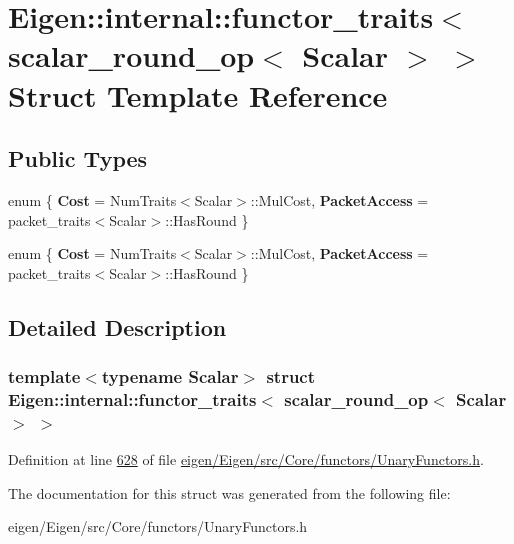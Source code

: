 \hypertarget{struct_eigen_1_1internal_1_1functor__traits_3_01scalar__round__op_3_01_scalar_01_4_01_4}{}\section{Eigen\+:\+:internal\+:\+:functor\+\_\+traits$<$ scalar\+\_\+round\+\_\+op$<$ Scalar $>$ $>$ Struct Template Reference}
\label{struct_eigen_1_1internal_1_1functor__traits_3_01scalar__round__op_3_01_scalar_01_4_01_4}
\subsection*{Public Types}
\begin{DoxyCompactItemize}
\item 
\mbox{\label{struct_eigen_1_1internal_1_1functor__traits_3_01scalar__round__op_3_01_scalar_01_4_01_4_af1565cba823ebf18c1f3a143ba25bf5b}} 
enum \{ {\bfseries Cost} = Num\+Traits$<$Scalar$>$\+:\+:Mul\+Cost, 
{\bfseries Packet\+Access} = packet\+\_\+traits$<$Scalar$>$\+:\+:Has\+Round
 \}
\item 
\mbox{\label{struct_eigen_1_1internal_1_1functor__traits_3_01scalar__round__op_3_01_scalar_01_4_01_4_a13d0d18354014fda4cb21c72f826958c}} 
enum \{ {\bfseries Cost} = Num\+Traits$<$Scalar$>$\+:\+:Mul\+Cost, 
{\bfseries Packet\+Access} = packet\+\_\+traits$<$Scalar$>$\+:\+:Has\+Round
 \}
\end{DoxyCompactItemize}


\subsection{Detailed Description}
\subsubsection*{template$<$typename Scalar$>$\newline
struct Eigen\+::internal\+::functor\+\_\+traits$<$ scalar\+\_\+round\+\_\+op$<$ Scalar $>$ $>$}



Definition at line \hyperlink{eigen_2_eigen_2src_2_core_2functors_2_unary_functors_8h_source_l00628}{628} of file \hyperlink{eigen_2_eigen_2src_2_core_2functors_2_unary_functors_8h_source}{eigen/\+Eigen/src/\+Core/functors/\+Unary\+Functors.\+h}.



The documentation for this struct was generated from the following file\+:\begin{DoxyCompactItemize}
\item 
eigen/\+Eigen/src/\+Core/functors/\+Unary\+Functors.\+h\end{DoxyCompactItemize}

